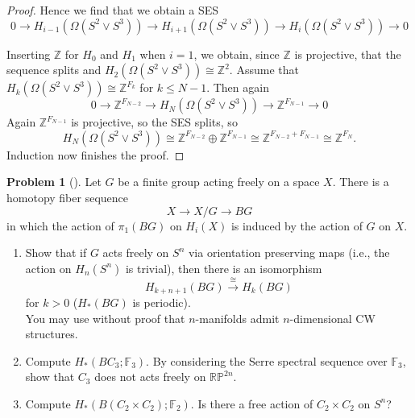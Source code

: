 \documentclass[reqno]{amsart}
\theoremstyle{definition}
\newtheorem{problem}[theorem]{Problem}
\theoremstyle{remark}
\begin{document}
\begin{proof}
Hence we find that we obtain a SES
\[
0 \to  H_{i-1} \left( \Omega \left( S^2 \vee S^3 \right)  \right) 
\to H_{i+1} \left( \Omega \left( 
S^2 \vee S^3 \right)  \right) 
\to H_i \left( \Omega \left( S^2 \vee S^3 \right)  \right) 
\to 0
\] 
        
Inserting $\mathbb{Z}$ for
$H_{0}$ and
$H_1$ when $i = 1$,
we obtain, since $\mathbb{Z}$ is projective,
that the sequence splits
and $H_2 \left( \Omega
\left( S^2 \vee S^3 \right) \right) \cong
\mathbb{Z}^2$. Assume that
$H_k \left( \Omega
\left( S^2 \vee S^3 \right) \right) \cong
\mathbb{Z}^{F_k}$ for $k\le N-1$.
Then again
\[
0 \to \mathbb{Z}^{F_{N-2}}
\to H_{N}\left( \Omega \left( S^2 \vee S^3 \right)  \right) 
\to \mathbb{Z}^{F_{N-1}} \to 0
\] 
Again $\mathbb{Z}^{F_{N-1}}$ is projective, so the
SES splits, so
\[
    H_{N}\left( \Omega \left( S^2 \vee S^3 \right)  \right) 
\cong
\mathbb{Z}^{F_{N-2}}
\oplus \mathbb{Z}^{F_{N-1}}
\cong \mathbb{Z}^{F_{N-2} + F_{N-1}}
\cong \mathbb{Z}^{F_N}.
\]
Induction now finishes the proof.






    \end{proof}





    \begin{problem}[]
        Let $G$ be a finite group acting freely on a space
        $X$. There is a homotopy fiber sequence
        \[
        X \to X /G \to BG
        \] 
        in which the action of $\pi_1 (BG)$ on
        $H_i(X)$ is induced by the action
        of $G$ on $X$.
        \begin{enumerate}
            \item Show that if $G$ acts freely
                on $S^{n}$ via orientation preserving
                maps (i.e., the action on
                $H_n(S^{n})$ is trivial), then
                there is an isomorphism
                \[
                H_{k+n+1}(BG) \stackrel{\cong}{\to} 
                H_k(BG)
                \] 
                for $k>0$ ($H_*(BG)$ is periodic).\\
                You may use without proof that
                $n$-manifolds admit $n$-dimensional CW structures.
            \item Compute $H_* (BC_3 ; \mathbb{F}_3)$.
                By considering the Serre spectral sequence
                over $\mathbb{F}_3$, show that
                $C_3$ does not acts freely on 
                $\mathbb{R}\mathbb{P}^{2n}$.
            \item Compute $H_{*}\left( B
                \left( C_2 \times C_2 \right) ; \mathbb{F}_2\right) $.
                Is there a free action of $C_2 \times C_2$ on
                 $S^{n}$?
        \end{enumerate}
    \end{problem}
\end{document}
